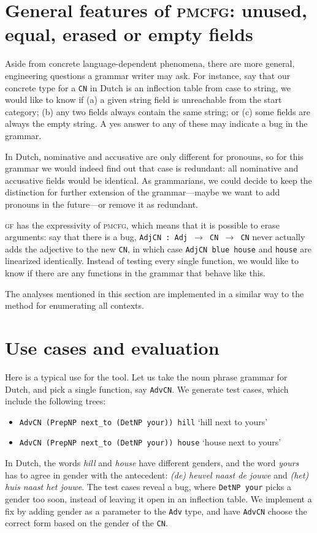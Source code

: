 \documentclass[11pt]{article}
\def\t#1{\texttt{#1}}
\def\gf{\textsc{gf}}
\def\pmcfg{\textsc{pmcfg}}
\begin{document}
\section{General features of \pmcfg: unused, equal,
  erased or empty fields}

Aside from concrete language-dependent phenomena, there are more
general, engineering questions a grammar writer may ask. For instance, say that our
concrete type for a \t{CN} in Dutch is an inflection table from case
to string, we would like to know if (a) a given string field is unreachable from the start category; (b) any two fields always contain the same string; or (c) some fields
are always the empty string. A yes answer to any of these may indicate a bug in the grammar.

In Dutch, nominative and accusative are only different for
pronouns, so for this grammar we would indeed find out that case is
redundant: all nominative and accusative fields would be
identical. As grammarians, we could decide to keep the distinction for
further extension of the grammar---maybe we want to add pronouns in
the future---or remove it as redundant.

\gf{} has the expressivity of \pmcfg{}, which means that it is
possible to erase arguments: say that there is a bug, \t{AdjCN : Adj
  $\rightarrow$ CN  $\rightarrow$ CN} never actually adds the
adjective to the new \t{CN}, in which case \t{AdjCN blue house} and
\t{house} are linearized identically. Instead of testing every single
function, we would like to know if there are any functions in the
grammar that behave like this.

The analyses mentioned in this section are implemented in a similar way to the method for enumerating all contexts.

\section{Use cases and evaluation}

Here is a typical use for the tool. 
Let us take the noun phrase grammar for Dutch, and pick a single function,
say \t{AdvCN}. We generate test cases, which include the following
trees: 
\begin{itemize}
\item \t{AdvCN (PrepNP next\_to (DetNP your)) hill} `hill next to
yours'
\item \t{AdvCN (PrepNP next\_to (DetNP your)) house} `house next
to yours'
\end{itemize}
In Dutch, the words \emph{hill} and \emph{house} have different
genders, and the word \emph{yours} has to agree in gender 
with the antecedent: \emph{(de) heuvel naast de jouwe} and \emph{(het)
  huis naast het jouwe}. The test cases reveal a bug, where \t{DetNP your} 
picks a gender too soon, instead of leaving it open in an inflection
table. We implement a fix by adding gender as a parameter to the
\t{Adv} type, and have \t{AdvCN} choose the correct form based on the gender of the \t{CN}. 
\end{document}
